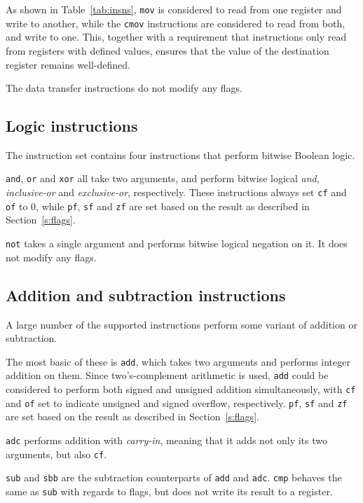 \documentclass[a4paper,11pt]{kth-mag}
\begin{document}
As shown in Table~\ref{tab:insns}, \verb|mov| is considered to read from one register and write to another, while the \verb|cmov| instructions are considered to read from both, and write to one.
This, together with a requirement that instructions only read from registers with defined values, ensures that the value of the destination register remains well-defined.

The data transfer instructions do not modify any flags.

\subsection{Logic instructions}

The instruction set contains four instructions that perform bitwise Boolean logic.

\verb|and|, \verb|or| and \verb|xor| all take two arguments, and perform bitwise logical \emph{and}, \emph{inclusive-or} and \emph{exclusive-or}, respectively.
These instructions always set \verb|cf| and \verb|of| to 0, while \verb|pf|, \verb|sf| and \verb|zf| are set based on the result as described in Section~\ref{s:flags}.

\verb|not| takes a single argument and performs bitwise logical negation on it.
It does not modify any flags.

\subsection{Addition and subtraction instructions}

A large number of the supported instructions perform some variant of addition or subtraction.

The most basic of these is \verb|add|, which takes two arguments and performs integer addition on them.
Since two's-complement arithmetic is used, \verb|add| could be considered to perform both signed and unsigned addition simultaneously, with \verb|cf| and \verb|of| set to indicate unsigned and signed overflow, respectively.
\verb|pf|, \verb|sf| and \verb|zf| are set based on the result as described in Section~\ref{s:flags}.

\verb|adc| performs addition with \emph{carry-in}, meaning that it adds not only its two arguments, but also \verb|cf|.

\verb|sub| and \verb|sbb| are the subtraction counterparts of \verb|add| and \verb|adc|.
\verb|cmp| behaves the same as \verb|sub| with regards to flags, but does not write its result to a register.
\end{document}
